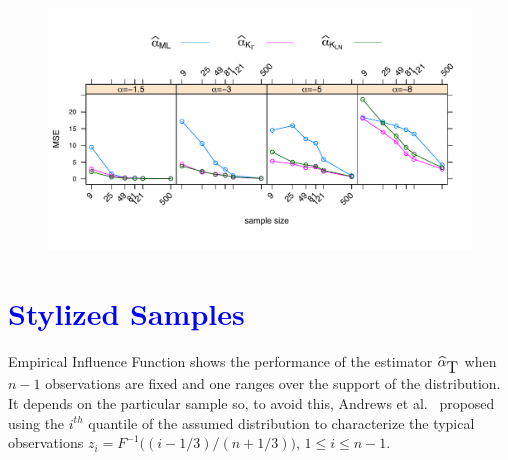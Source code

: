 \documentclass[a0,portrait]{a0poster}
\begin{document}
\begin{multicols}{3}
	
\begin{center}
	\begin{minipage}[t]{0.96\linewidth}
	\begin{figure}
		\includegraphics[scale=1]{../../../../Figures/IVJIAAIS2017/Cont/ECM_500_L3MVconX0yGAyLN_OPTIM_hasta500_MOM1_2_SinCte_Ver2FINALeps05.pdf}
		\end{figure}
	\end{minipage}
\end{center}


\section*{\textcolor{blue}{Stylized Samples}}
Empirical Influence Function shows the performance of the estimator $\widehat{\alpha}_{\text{\tiny{T}}}$ when $n-1$ observations are fixed and one ranges over the support of the distribution. It depends on the particular sample so, to avoid this, Andrews et al.~\cite{Andrews1972} proposed using the $i^{th}$ quantile of the assumed distribution to characterize the typical observations $z_i=F^{-1}\big((i-1/3)/(n+1/3) \big)$, $1\leq i\leq n-1$.


\end{multicols}
\end{document}
